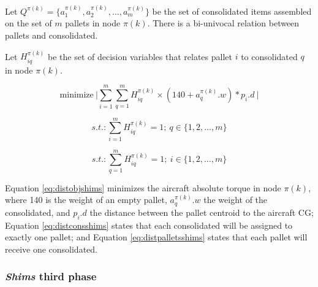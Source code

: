 \documentclass[preprint,authoryear]{elsarticle}
\begin{document}
Let $Q^{\pi(k)}  = \{ a^{\pi(k)}_1, a^{\pi(k)}_2, \ldots, a^{\pi(k)}_m \}$ be the set of consolidated items assembled on the set of $m$ pallets in node $\pi(k)$. There is a bi-univocal relation between pallets and consolidated.

Let $H^{\pi(k)}_{iq}$ be the set of decision variables that relates pallet $i$ to consolidated $q$ in node $\pi(k)$.

\begin{equation} \label{eq:distobjshims}
	\mbox{minimize}\ \Bigg |  \sum_{i=1}^{m} \sum_{q=1}^{m} H^{\pi(k)}_{iq} \times  (140 + a^{\pi(k)}_q.w) * p_i.d\ \Bigg | 
\end{equation}

\begin{equation} \label{eq:distconsshims}
	s.t.: \sum_{i=1}^{m} H^{\pi(k)}_{iq} = 1;\ q \in \{1,2,\ldots,m\}
\end{equation}

\begin{equation} \label{eq:distpalletsshims}
	s.t.: \sum_{q=1}^{m} H^{\pi(k)}_{iq}=1;\ i \in \{1,2,\ldots,m\}
\end{equation}

Equation \ref{eq:distobjshims} minimizes the aircraft absolute torque in node $\pi(k)$, where 140 is the weight of an empty pallet, $a^{\pi(k)}_q.w$ the weight of the consolidated, and $p_i.d$ the distance between the pallet centroid to the aircraft CG; Equation \ref{eq:distconsshims} states that each consolidated will be assigned to exactly one pallet; and Equation \ref{eq:distpalletsshims} states that each pallet will receive one consolidated.


\subsubsection{{\it Shims} third phase}
\end{document}
